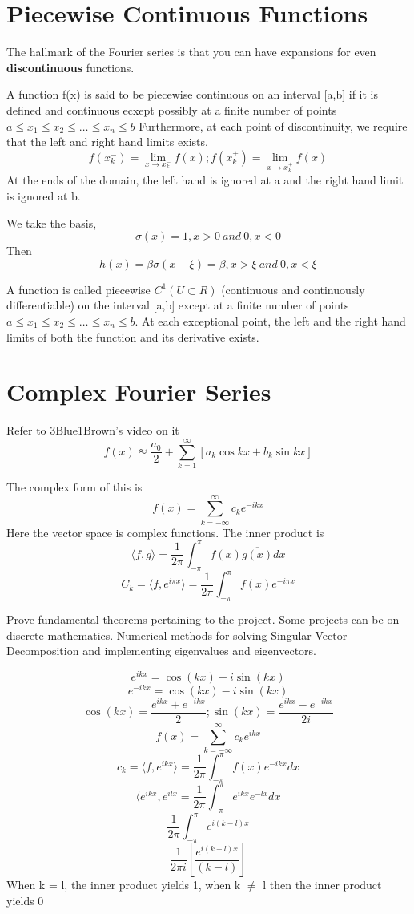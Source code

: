 \documentclass[twoside]{report}
\begin{document}
\section{Piecewise Continuous Functions}
The hallmark of the Fourier series is that you can have expansions for even \textbf{discontinuous} functions. 

\begin{definition}
   A function f(x) is said to be piecewise continuous on an interval [a,b] if it is defined and continuous ecxept possibly at a finite number of points $a\leq x_1 \leq x_2 \leq \dots \leq x_n \leq b$ Furthermore, at each point of discontinuity, we require that the left and right hand limits exists. 
   \[
      f(x_k^-) = \lim_{x \rightarrow x_k^-} f(x); f(x_k^+) = \lim_{x\rightarrow x_k^+} f(x)
   \]
   At the ends of the domain, the left hand is ignored at a and the right hand limit is ignored at b.
\end{definition}
We take the basis,
\[
   \sigma(x) = 1, x>0 \ and \ 0, x<0
\]
Then
\[
	h(x) = \beta \sigma(x - \xi) = \beta, x> \xi \ and \ 0, x<\xi
\]
\begin{definition}[Piecewise $C^1$]
   A function is called piecewise $C^1(U \subset R)$ (continuous and continuously differentiable) on the interval [a,b] except at a finite number of points $a\leq x_1 \leq x_2 \leq \dots \leq x_n \leq b$. At each exceptional point, the left and the right hand limits of both the function and its derivative exists.
\end{definition}
\section{Complex Fourier Series}
Refer to 3Blue1Brown's video on it
\[
   f(x) \approxeq \frac{a_0}{2}+\sum_{k=1}^{\infty}[a_k \cos{kx} + b_k \sin{kx}]
\]

The complex form of this is
\[
   f(x) = \sum_{k=-\infty}^{\infty} c_k e^{-ikx}
\]
Here the vector space is complex functions.
The inner product is 
\[
   \langle f,g \rangle = \frac{1}{2\pi}\int_{-\pi}^{\pi} f(x) \overline{g(x)} dx
\]
\[
   C_k = \langle f, e^{i\pi x} \rangle = \frac{1}{2\pi} \int_{-\pi}^{\pi} f(x) e^{-i\pi x}
\]
\begin{note}
   Prove fundamental theorems pertaining to the project. Some projects can be on discrete mathematics. Numerical methods for solving Singular Vector Decomposition and implementing eigenvalues and eigenvectors.  
\end{note}
\[
e^{ikx} = \cos{(kx)} + i \sin{(kx)}
\]
\[
   e^{-ikx} = \cos{(kx)} - i \sin{(kx)}
\]
\[
\cos{(kx)} = \frac{e^{ikx} + e^{-ikx}}{2} ; \sin{(kx)} = \frac{e^{ikx} - e^{-ikx}}{2i}
\]
\[
   f(x) = \sum_{k=-\infty}^{\infty} c_k e^{ikx}
\]
\[
   c_k = \langle f, e^{ikx} \rangle = \frac{1}{2\pi} \int_{-\pi}^{\pi} f(x) e^{-ikx}dx
\]
\[
   \langle e^{ikx},e^{ilx} = \frac{1}{2\pi} \int_{-\pi}^\pi e^{ikx} e^{-lx}dx
\]
\[
   \frac{1}{2\pi} \int_{-\pi}^\pi e^{i(k-l)x}
\]
\[
   \frac{1}{2\pi i}[\frac{e^{i(k-l)x}}{(k-l)}]
\]
When k = l, the inner product yields 1, when k $\neq$ l then the inner product yields 0
\end{document}
